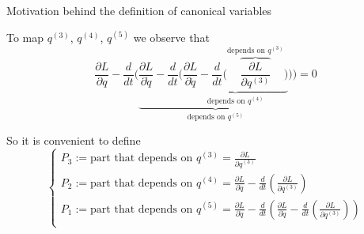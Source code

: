 \documentclass[10pt]{beamer}
\begin{document}
  \begin{frame}{Motivation behind the definition of canonical variables}
    \begin{alertblock}{}
      To map $q^{(3)}$, $q^{(4)}$, $q^{(5)}$ we observe that
      \begin{equation*} \label{eq:third_order_euler_lagrangian_h_with_parts}
        \frac{\partial L}{\partial q} -
        \frac{d}{dt} \biggl(
        \underbrace{
        \frac{\partial L}{\partial \dot{q}} -
        \frac{d}{dt} \biggl(
        \underbrace{
        \frac{\partial L}{\partial \ddot{q}} -
        \frac{d}{dt} \biggl(
        \overbrace{
        \frac{\partial L}{\partial q^{(3)}}
        }^{\text{depends on } q^{(3)}} \biggr)
        }_{\text{depends on } q^{(4)}} \biggr)
        }_{\text{depends on } q^{(5)}} \biggr)
        = 0
      \end{equation*}

      So it is convenient to define
      \begin{equation*}\label{eq:def_P}
        \begin{cases}
          P_3 := \text{part that depends on } q^{(3)}
               = \frac{\partial L}{\partial q^{(3)}} \\
          P_2 := \text{part that depends on } q^{(4)}
               = \frac{\partial L}{\partial \ddot{q}} -
                 \frac{d}{dt} \left(
                   \frac{\partial L}{\partial q^{(3)}}
                 \right) \\
          P_1 := \text{part that depends on } q^{(5)}
               = \frac{\partial L}{\partial \dot{q}} -
                 \frac{d}{dt} \left(
                   \frac{\partial L}{\partial \ddot{q}} -
                   \frac{d}{dt} \left(
                     \frac{\partial L}{\partial q^{(3)}}
                    \right)
                  \right) \\
        \end{cases}
      \end{equation*}
    \end{alertblock}
  \end{frame}
\end{document}
